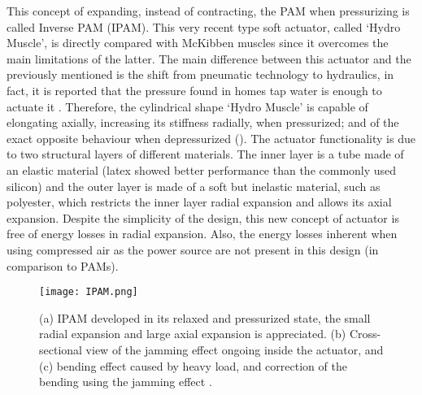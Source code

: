 This concept of expanding, instead of contracting, the PAM when pressurizing is called Inverse PAM (IPAM). This very recent type soft actuator, called `Hydro Muscle', is directly compared with McKibben muscles since it overcomes the main limitations of the latter. The main difference between this actuator and the previously mentioned is the shift from pneumatic technology to hydraulics, in fact, it is reported that the pressure found in homes tap water is enough to actuate it \cite{Sridar2016}. Therefore, the cylindrical shape `Hydro Muscle' is capable of elongating axially, increasing its stiffness radially, when pressurized; and of the exact opposite behaviour when depressurized (). The actuator functionality is due to two structural layers of different materials. The inner layer is a tube made of an elastic material (latex showed better performance than the commonly used silicon) and the outer layer is made of a soft but inelastic material, such as polyester, which restricts the inner layer radial expansion and allows its axial expansion. Despite the simplicity of the design, this new concept of actuator is free of energy losses in radial expansion. Also, the energy losses inherent when using compressed air as the power source are not present in this design (in comparison to PAMs).
\begin{figure}[hbtp!]
    \centering
    \texttt{[image: IPAM.png]}
    \caption{(a) IPAM developed in its relaxed and pressurized state, the small radial expansion and large axial expansion is appreciated. (b) Cross-sectional view of the jamming effect ongoing inside the actuator, and (c) bending effect caused by heavy load, and correction of the bending using the jamming effect \cite{Sridar2016}. }
    \label{fig:IPAM}
\end{figure}

